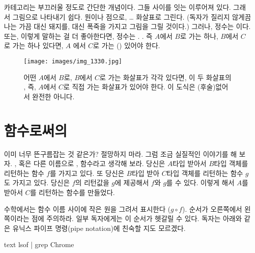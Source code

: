 

\lettrine[lhang=0.17]{카}{테고리}는 부끄러울 정도로 간단한 개념이다.
\trCategory\는 \newterm{\trObject}\와 그들 사이를 잇는 \newterm{\trArrow}\로 이루어져 있다. 
그래서 \trCategory\는 그림으로 나타내기 쉽다. \trObject\는 원이나 점으로, 
\trArrow\는\ldots{} 화살표로 그린다. (독자가 질리지 않게끔 
나는 가끔 \trObject 대신 돼지를, \trArrow 대신 폭죽을 가지고 그림을 그릴 것이다.)
그러나,  정수는 \emph{\trComposition}이다. 또는, 이렇게 말하는 걸 더 좋아한다면,  정수는 .
\trArrow\는 . 
즉 \trObject $A$에서 \trObject $B$로 가는 \trArrow\가 하나, \trObject $B$에서 \trObject $C$로 가는 \trArrow\가 하나 있다면, 
$A$ 에서 $C$로 가는 \trArrow\가(\trComposition\이) 있어야 한다.

\begin{figure}
\centering
\texttt{[image: images/img\_1330.jpg]}
\caption{어떤  $A$에서 $B$로, $B$에서 $C$로 가는 화살표가 각각 있다면,
이 두 화살표의 \trComposition, 즉, $A$에서 $C$로 직접 가는 화살표가 있어야 한다.
이 도식은 \trIdentityMorphism(후술)\이 없어서 완전한 \trCategory\는 아니다.}
\end{figure}

\section{함수로써의 \trArrow}

이미 너무 뜬구름잡는 것 같은가? 절망하지 마라. 그럼 조금 실질적인 이야기를 해 보자.
\trArrow\를, 혹은 다른 이름으로 \newterm{\trMorphism}\을, 함수라고 생각해 보라.
당신은 $A$타입 \trArgument\를 받아서 $B$타입 객체를 리턴하는 함수 $f$를 가지고 있다.
또 당신은 $B$타입 \trArgument\를 받아 $C$타입 객체를 리턴하는 함수 $g$도 가지고 있다.
당신은 $f$의 리턴값을 $g$에 제공해서 $f$와 $g$를  수 있다.
이렇게 해서 $A$를 받아서 $C$를 리턴하는 함수를 만들었다.

수학에서는 함수 이름 사이에 작은 원을 그려서 \trComposition\을 표시한다 ($g \circ f$). 
\trComposition 순서가 오른쪽에서 왼쪽이라는 점에 주의하라. 일부 독자에게는 이 순서가 헷갈릴 수 있다.
독자는 아래와 같은 유닉스 파이프 명령(pipe notation)에 친숙할 지도 모르겠다.

\begin{snip}{text}
lsof | grep Chrome
\end{snip}

